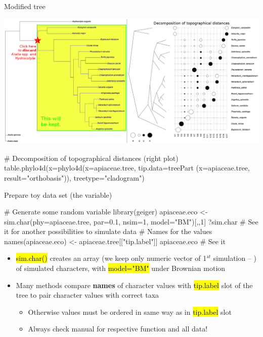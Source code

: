 \documentclass[compress, ucs, xelatex, 11pt, xcolor=svgnames,
  hyperref={
    bookmarks=true,
    unicode=true,
    colorlinks=true,
    pdftitle={Molecular data in R},
    plainpages=false,
    pdfauthor={Vojtech Zeisek},
    pdfsubject={Course about phylogeny and evolution in R},
    pdfcreator={XeLaTeX},
    pdfkeywords={R, evolution, phylogeny, molecular data},
    linkcolor=Tomato,
    anchorcolor=SaddleBrown,
    citecolor=Goldenrod,
    filecolor=DarkMagenta,
    menucolor=Sienna,
    urlcolor=DarkTurquoise,
    pdftex},
  url={hyphens, lowtilde} %
  ]{beamer}
\renewcommand{\texttt}[1]{\hl{\ttfamily #1}}
\begin{document}
\begin{frame}[fragile]{Modified tree}
  \vfil
  \begin{center}
    \includegraphics[width=\textwidth-0.5cm]{apiaceae_tree.png}
  \end{center}
  \vfill
  \begin{spluscode}
    # Decomposition of topographical distances (right plot)
    table.phylo4d(x=phylo4d(x=apiaceae.tree, tip.data=treePart
      (x=apiaceae.tree, result="orthobasis")), treetype="cladogram")
  \end{spluscode}
  \vfill
\end{frame}

\begin{frame}[fragile]{Prepare toy data set (the variable)}
  \begin{spluscode}
    # Generate some random variable
    library(geiger)
    apiaceae.eco <- sim.char(phy=apiaceae.tree, par=0.1, nsim=1,
      model="BM")[,,1]
    ?sim.char # See it for another possibilities to simulate data
    # Names for the values
    names(apiaceae.eco) <- apiaceae.tree[["tip.label"]]
    apiaceae.eco # See it
  \end{spluscode}
  \begin{itemize}
    \item \texttt{sim.char()} creates an array (we keep only numeric vector of 1$^{st}$ simulation -- \texttt{[,,1]}) of simulated characters, with \texttt{model="BM"} under Brownian motion
    \item Many methods compare \textbf{names} of character values with \texttt{tip.label} slot of the tree to pair character values with correct taxa
    \begin{itemize}
      \item Otherwise values must be ordered in same way as in \texttt{tip.label} slot
      \item \alert{Always check manual for respective function and all data!}
    \end{itemize}
  \end{itemize}
\end{frame}
\end{document}
